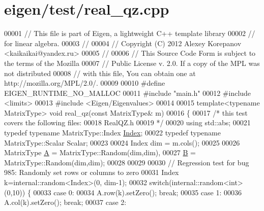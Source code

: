 \hypertarget{eigen_2test_2real__qz_8cpp_source}{}\section{eigen/test/real\+\_\+qz.cpp}
\label{eigen_2test_2real__qz_8cpp_source}

\begin{DoxyCode}
00001 \textcolor{comment}{// This file is part of Eigen, a lightweight C++ template library}
00002 \textcolor{comment}{// for linear algebra.}
00003 \textcolor{comment}{//}
00004 \textcolor{comment}{// Copyright (C) 2012 Alexey Korepanov <kaikaikai@yandex.ru>}
00005 \textcolor{comment}{//}
00006 \textcolor{comment}{// This Source Code Form is subject to the terms of the Mozilla}
00007 \textcolor{comment}{// Public License v. 2.0. If a copy of the MPL was not distributed}
00008 \textcolor{comment}{// with this file, You can obtain one at http://mozilla.org/MPL/2.0/.}
00009 
00010 \textcolor{preprocessor}{#define EIGEN\_RUNTIME\_NO\_MALLOC}
00011 \textcolor{preprocessor}{#include "main.h"}
00012 \textcolor{preprocessor}{#include <limits>}
00013 \textcolor{preprocessor}{#include <Eigen/Eigenvalues>}
00014 
00015 \textcolor{keyword}{template}<\textcolor{keyword}{typename} MatrixType> \textcolor{keywordtype}{void} real\_qz(\textcolor{keyword}{const} MatrixType& m)
00016 \{
00017   \textcolor{comment}{/* this test covers the following files:}
00018 \textcolor{comment}{     RealQZ.h}
00019 \textcolor{comment}{  */}
00020   \textcolor{keyword}{using} std::abs;
00021   \textcolor{keyword}{typedef} \textcolor{keyword}{typename} MatrixType::Index \hyperlink{namespace_eigen_a62e77e0933482dafde8fe197d9a2cfde}{Index};
00022   \textcolor{keyword}{typedef} \textcolor{keyword}{typename} MatrixType::Scalar Scalar;
00023   
00024   Index dim = m.cols();
00025   
00026   MatrixType \hyperlink{group___core___module_class_eigen_1_1_matrix}{A} = MatrixType::Random(dim,dim),
00027              \hyperlink{group___core___module_class_eigen_1_1_matrix}{B} = MatrixType::Random(dim,dim);
00028 
00029 
00030   \textcolor{comment}{// Regression test for bug 985: Randomly set rows or columns to zero}
00031   Index k=internal::random<Index>(0, dim-1);
00032   \textcolor{keywordflow}{switch}(internal::random<int>(0,10)) \{
00033   \textcolor{keywordflow}{case} 0:
00034     A.row(k).setZero(); \textcolor{keywordflow}{break};
00035   \textcolor{keywordflow}{case} 1:
00036     A.col(k).setZero(); \textcolor{keywordflow}{break};
00037   \textcolor{keywordflow}{case} 2:

\end{DoxyCode}
